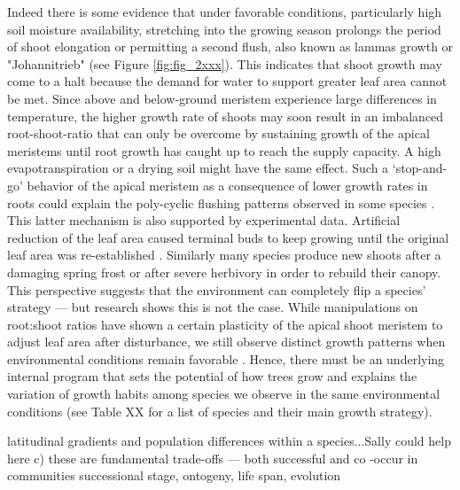 \documentclass{article}
\begin{document}
Indeed there is some evidence that under favorable conditions, particularly high soil moisture availability, stretching into the growing season prolongs the period of shoot elongation or permitting a second flush, also known as lammas growth or "Johannitrieb" (see Figure \ref{fig:fig_2xxx}). This indicates that shoot growth may come to a halt because the demand for water to support greater leaf area cannot be met. Since above and below-ground meristem experience large differences in temperature, the higher growth rate of shoots may soon result in an imbalanced root-shoot-ratio that can only be overcome by sustaining growth of the apical meristems until root growth has caught up to reach the supply capacity. A high evapotranspiration or a drying soil might have the same effect. Such a `stop-and-go' behavior of the apical meristem as a  consequence of lower growth rates in roots could explain the poly-cyclic flushing patterns observed in some species \cite{girardPolycyclismFundamentalTree2011}. This latter mechanism is also supported by experimental data. Artificial reduction of the leaf area caused terminal buds to keep growing until the original leaf area was re-established \citep{borchertSimulationRhythmicTree1973}. Similarly many species produce new shoots after a damaging spring frost or after severe herbivory in order to rebuild their canopy. \\

This perspective suggests that the environment can completely flip a species' strategy --- but research shows this is not the case. While manipulations on root:shoot ratios have shown a certain plasticity of the apical shoot meristem to adjust leaf area after disturbance, we still observe distinct growth patterns when environmental conditions remain favorable . Hence, there must be an underlying internal program that sets the potential of how trees grow and explains the variation of growth habits among species we observe in the same environmental conditions (see Table XX for a list of species and their main growth strategy). 

latitudinal gradients and population differences within a species...Sally could help here
	c) these are fundamental trade-offs --- both successful and co -occur in communities
	successional stage, ontogeny, life span, evolution
	
\end{document}

